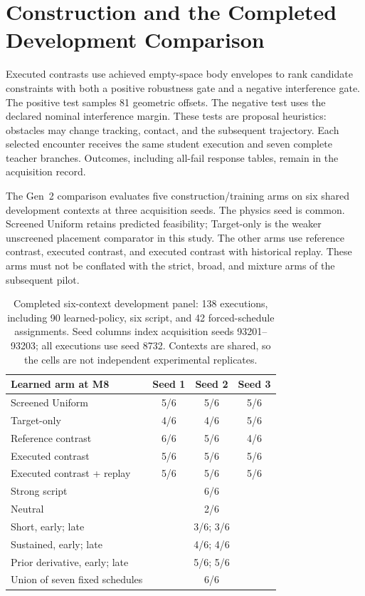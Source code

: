 \documentclass[letterpaper,10pt,conference]{ieeeconf}
\begin{document}
\section{Construction and the Completed Development Comparison}
Executed contrasts use achieved empty-space body envelopes to rank candidate
constraints with both a positive robustness gate and a negative interference
gate. The positive test samples 81 geometric offsets. The negative test uses
the declared nominal interference margin. These tests are proposal heuristics:
obstacles may change tracking, contact, and the subsequent trajectory. Each
selected encounter receives the same student execution and seven complete
teacher branches. Outcomes, including all-fail response tables, remain in the
acquisition record.

The Gen~2 comparison evaluates five construction/training arms on six shared
development contexts at three acquisition seeds. The physics seed is common.
Screened Uniform retains predicted feasibility; Target-only is the weaker
unscreened placement comparator in this study. The other arms use reference
contrast, executed contrast, and executed contrast with historical replay.
These arms must not be conflated with the strict, broad, and mixture arms of
the subsequent pilot.

\begin{table}[t]\centering\small
\footnotesize
\begin{tabular}{lccc}\toprule
Learned arm at M8 & Seed 1 & Seed 2 & Seed 3\\\midrule
Screened Uniform & 5/6 & 5/6 & 5/6\\
Target-only & 4/6 & 4/6 & 5/6\\
Reference contrast & 6/6 & 5/6 & 4/6\\
Executed contrast & 5/6 & 5/6 & 5/6\\
Executed contrast + replay & 5/6 & 5/6 & 5/6\\\midrule
Strong script & \multicolumn{3}{c}{6/6}\\
Neutral & \multicolumn{3}{c}{2/6}\\
Short, early; late & \multicolumn{3}{c}{3/6; 3/6}\\
Sustained, early; late & \multicolumn{3}{c}{4/6; 4/6}\\
Prior derivative, early; late & \multicolumn{3}{c}{5/6; 5/6}\\
Union of seven fixed schedules & \multicolumn{3}{c}{6/6}\\\bottomrule
\end{tabular}
\caption{Completed six-context development panel: 138 executions, including
90 learned-policy, six script, and 42 forced-schedule assignments. Seed columns
index acquisition seeds 93201--93203; all executions use seed 8732. Contexts are
shared, so the cells are not independent experimental replicates.}
\label{tab:development}
\end{table}
\end{document}
